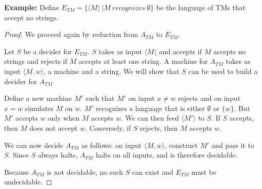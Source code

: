 \textbf{Example:}  Define $E_{TM} = \{ \langle M \rangle  \ | M \ recognizes \ \emptyset\}$ be the language of TMs that accept no strings.


\begin{proof}
	We proceed again by reduction from $A_{TM}$ to $E_{TM}$.
	
	Let $S$ be a decider for $E_{TM}$.  $S$ takes as input $\langle M \langle$ and accepts if $M$ accepts no strings and rejects if $M$ accepts at least one string.  A machine for $A_{TM}$ takes as input $\langle M,w\rangle$, a machine and a string.  We will show that $S$ can be used to build a decider for $A_{TM}$
	
	Define a new machine $M'$ such that $M'$ on input $x\neq w$ rejects and on input $x=w$ simulates $M$ on $w$.  $M'$ recognizes a language that is either $\emptyset$ or $\{w\}$.  But $M'$ accepts $w$ only when $M$ accepts $w$.  We can then feed $\langle M' \rangle$ to $S$.  If $S$ accepts, then $M$ does not accept $w$.  Conversely, if $S$ rejects, then $M$ accepts $w$.
	
	We can now decide $A_{TM}$ as follows: on input $\langle M,w\rangle$, construct $M'$ and pass it to $S$.  Since $S$ always halts, $A_{TM}$ halts on all inputs, and is therefore decidable.
	
	Because $A_{TM}$ is not decidable, no such $S$ can exist and $E_{TM}$ must be undecidable.
	
	
	
\end{proof}








